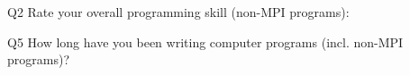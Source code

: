 \begin{description}%
\item{Q2} Rate your overall programming skill (non-MPI programs):%
\item{Q5} How long have you been writing computer programs (incl. non-MPI programs)?%
\end{description}%
